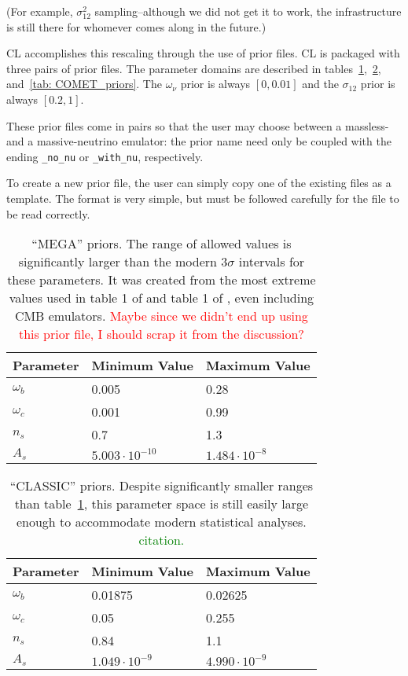 (For example, $\sigma_{12}^2$ sampling--although we did not
get it to work, the infrastructure is still there for whomever comes along in
the future.)


CL accomplishes this rescaling through the use of prior files.
CL is packaged with three pairs of prior files. The parameter domains are
described in tables~\ref{tab: MEGA_priors},~\ref{tab: CLASSIC_priors},
and~\ref{tab: COMET_priors}. The $\omega_\nu$ prior is always $[0, 0.01]$ and 
the $\sigma_{12}$ prior is always $[0.2, 1]$.

These prior files come in pairs so that the user may choose between a
massless- and a massive-neutrino emulator: the prior name need only be
coupled with the ending \verb|_no_nu| or \verb|_with_nu|, respectively.

To create a new prior file, the user can simply copy one of the
existing files as a template. The format is very simple, but must be
followed carefully for the file to be read correctly.

\begin{table}[ht!]
\centering
\begin{tabular}{l|l|l}
\hline
Parameter & Minimum Value & Maximum Value \\ \hline
$\omega_b$ & 0.005 & 0.28 \\
$\omega_c$ & 0.001 & 0.99 \\
$n_s$ & 0.7 & 1.3 \\
$A_s$\footnotemark & $5.003 \cdot 10^{-10}$ & $1.484 \cdot 10^{-8}$  \\
\end{tabular}
 \cprotect\caption[``MEGA'' priors]{``MEGA'' priors. The range of allowed
 	values is significantly larger than the modern $3\sigma$ intervals
 	for these parameters. It was created from the most extreme values used
 	in table 1 of \citet{Mancini} and table 1 of \citet{Arico}, even including
 	CMB emulators. 
 	\textcolor{red}{Maybe since we didn't end up using this prior file, I
 	should scrap it from the discussion?}}
 \label{tab: MEGA_priors}
\end{table}

\begin{table}[ht!]
\centering
\begin{tabular}{l|l|l}
\hline
Parameter & Minimum Value & Maximum Value \\ \hline
$\omega_b$ & 0.01875 & 0.02625 \\
$\omega_c$ & 0.05 & 0.255 \\
$n_s$ & 0.84 & 1.1 \\
$A_s$\footnotemark & $1.049 \cdot 10^{-9}$ & $4.990 \cdot 10^{-9}$  \\
\end{tabular}
	\cprotect\caption[``CLASSIC'' priors]{``CLASSIC'' priors. Despite
 	significantly smaller ranges than table~\ref{tab: MEGA_priors}, this
 	parameter space is still easily large enough to accommodate modern
 	statistical analyses. \textcolor{green}{citation.}}
 \label{tab: CLASSIC_priors}
\end{table}

